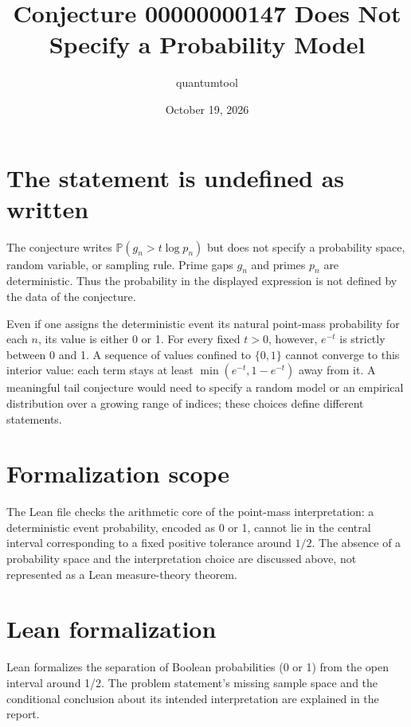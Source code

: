 \documentclass[11pt]{article}
\title{Conjecture 00000000147 Does Not Specify a Probability Model}
\author{quantumtool}
\date{October 19, 2026}
\begin{document}
\maketitle
\section*{The statement is undefined as written}
The conjecture writes $\mathbb P(g_n>t\log p_n)$ but does not specify a probability space, random variable, or sampling rule. Prime gaps $g_n$ and primes $p_n$ are deterministic. Thus the probability in the displayed expression is not defined by the data of the conjecture.

Even if one assigns the deterministic event its natural point-mass probability for each $n$, its value is either 0 or 1. For every fixed $t>0$, however, $e^{-t}$ is strictly between 0 and 1. A sequence of values confined to $\{0,1\}$ cannot converge to this interior value: each term stays at least $\min(e^{-t},1-e^{-t})$ away from it. A meaningful tail conjecture would need to specify a random model or an empirical distribution over a growing range of indices; these choices define different statements.

\section*{Formalization scope}
The Lean file checks the arithmetic core of the point-mass interpretation: a deterministic event probability, encoded as 0 or 1, cannot lie in the central interval corresponding to a fixed positive tolerance around $1/2$. The absence of a probability space and the interpretation choice are discussed above, not represented as a Lean measure-theory theorem.
\section*{Lean formalization}
Lean formalizes the separation of Boolean probabilities (0 or 1) from the open interval around 1/2. The problem statement’s missing sample space and the conditional conclusion about its intended interpretation are explained in the report.
\end{document}
